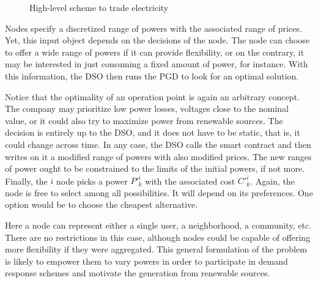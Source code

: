 \begin{figure}[!htb]\centering
    \caption{High-level scheme to trade electricity}
    \label{fig:algo1}
\end{figure}
Nodes specify a discretized range of powers with the associated range of prices. Yet, this input object depends on the decisions of the node. The node can choose to offer a wide range of powers if it can provide flexibility, or on the contrary, it may be interested in just consuming a fixed amount of power, for instance. With this information, the DSO then runs the PGD to look for an optimal solution. 

Notice that the optimality of an operation point is again an arbitrary concept. The company may prioritize low power losses, voltages close to the nominal value, or it could also try to maximize power from renewable sources. The decision is entirely up to the DSO, and it does not have to be static, that is, it could change across time. In any case, the DSO calls the smart contract and then writes on it a modified range of powers with also modified prices. The new ranges of power ought to be constrained to the limits of the initial powers, if not more. Finally, the $i$ node picks a power $P'^i_k$ with the associated cost $C'^i_k$. Again, the node is free to select among all possibilities. It will depend on its preferences. One option would be to choose the cheapest alternative.

Here a node can represent either a single user, a neighborhood, a community, etc. There are no restrictions in this case, although nodes could be capable of offering more flexibility if they were aggregated. This general formulation of the problem is likely to empower them to vary powers in order to participate in demand response schemes and motivate the generation from renewable sources.